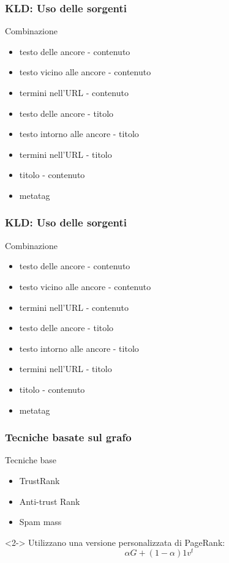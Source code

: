 \documentclass{beamer}
\begin{document}
\begin{frame}
  \frametitle{KLD: Uso delle sorgenti}
  \begin{block}{Combinazione}
  \begin{itemize}
      \item testo delle ancore - contenuto  
      \item testo vicino alle ancore - contenuto
      \item termini nell’URL - contenuto
      \item testo delle ancore - titolo
      \item testo intorno alle ancore - titolo
      \item termini nell’URL - titolo
      \item titolo - contenuto
      \item metatag
  \end{itemize}
  \end{block}
\end{frame}
\begin{frame}
  \frametitle{KLD: Uso delle sorgenti}
  \begin{block}{Combinazione}
  \begin{itemize}
      \item testo delle ancore - contenuto  
      \item testo vicino alle ancore - contenuto
      \item termini nell’URL - contenuto
      \item testo delle ancore - titolo
      \item testo intorno alle ancore - titolo
      \item termini nell’URL - titolo
      \item titolo - contenuto
      \item metatag
  \end{itemize}
  \end{block}
\end{frame}
\begin{frame}
  \frametitle{Tecniche basate sul grafo}
  \begin{block}{Tecniche base}
  \begin{itemize}
  \item TrustRank
  \item Anti-trust Rank
  \item Spam mass
  \end{itemize}
  \end{block}
  \begin{block}<2->{}
  Utilizzano una versione personalizzata di PageRank:
  \begin{equation}
   \alpha G + (1-\alpha)1v^t
   \label{eqn:pagerank}
  \end{equation}
  \end{block}
  \end{frame}
\end{document}
